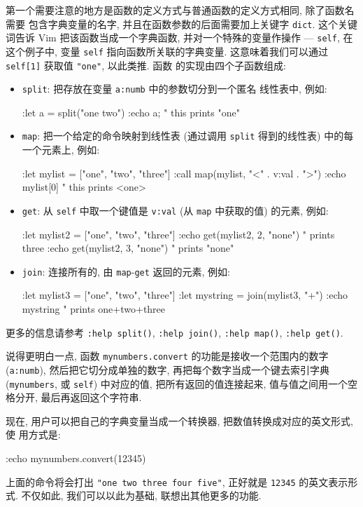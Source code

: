 第一个需要注意的地方是函数的定义方式与普通函数的定义方式相同, 除了函数名需要
包含字典变量的名字, 并且在函数参数的后面需要加上关键字 \texttt{dict}.
这个关键词告诉 Vim 把该函数当成一个字典函数, 并对一个特殊的变量作操作 ---
\texttt{self}, 在这个例子中, 变量 \texttt{self} 指向函数所关联的字典变量.
这意味着我们可以通过 \texttt{self[1]} 获取值 \texttt{"one"}, 以此类推. 函数
的实现由四个子函数组成:
\begin{itemize}
    \item \texttt{split}: 把存放在变量 \texttt{a:numb} 中的参数切分到一个匿名
        线性表中, 例如:
\begin{vimcode}
:let a = split("one two")
:echo a;    " this prints "one"
\end{vimcode}
\item \texttt{map}: 把一个给定的命令映射到线性表 (通过调用 \texttt{split}
    得到的线性表) 中的每一个元素上, 例如:
\begin{vimcode}
:let mylist = ["one", "two", "three"]
:call map(mylist, "<" . v:val . ">")
:echo mylist[0] " this prints <one>
\end{vimcode}
\item \texttt{get}: 从 \texttt{self} 中取一个键值是 \texttt{v:val} (从
    \texttt{map} 中获取的值) 的元素, 例如:
\begin{vimcode}
:let mylist2 = ["one", "two", "three"]
:echo get(mylist2, 2, "none") " prints three
:echo get(mylist2, 3, "none") " prints "none"
\end{vimcode}
\item \texttt{join}: 连接所有的, 由 \texttt{map}-\texttt{get} 返回的元素,
    例如:
\begin{vimcode}
:let mylist3 = ["one", "two", "three"]
:let mystring = join(mylist3, "+")
:echo mystring " prints one+two+three
\end{vimcode}
\end{itemize}
更多的信息请参考 \texttt{:help split()}, \texttt{:help join()},
\texttt{:help map()}, \texttt{:help get()}.

说得更明白一点, 函数 \texttt{mynumbers.convert} 的功能是接收一个范围内的数字
(\texttt{a:numb}), 然后把它切分成单独的数字, 再把每个数字当成一个键去索引字典
(\texttt{mynumbers}, 或 \texttt{self}) 中对应的值, 把所有返回的值连接起来,
值与值之间用一个空格分开, 最后再返回这个字符串.

现在, 用户可以把自己的字典变量当成一个转换器, 把数值转换成对应的英文形式, 使
用方式是:
\begin{vimcode}
:echo mynumbers.convert(12345)
\end{vimcode}
上面的命令将会打出 \texttt{"one two three four five"}, 正好就是 \texttt{12345}
的英文表示形式. 不仅如此, 我们可以以此为基础, 联想出其他更多的功能.

